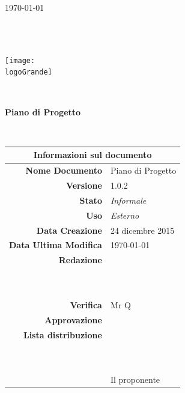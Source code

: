 \documentclass[12pt,a4paper]{article}
\title{\titoloDocumento}
\newcommand{\titoloDocumento}{Piano di Progetto}
\newcommand{\dataCreazione}{24 dicembre 2015}
\newcommand{\versione}{1.0.2}
\newcommand{\stato}{Informale}
\newcommand{\uso}{Esterno}
\begin{document}
\begin{titlepage}
\begin{center}
\today \\
\vspace{1cm}
\begin{Huge}
\textbf{\nomeGruppo} \\
\end{Huge}
\textbf{\prjL} \\
\vspace{1cm}
\texttt{[image: \\logoGrande]}
\vspace{1cm}

\HRule \\[0.4cm]
\begin{Huge}
{\huge \bfseries \titoloDocumento}\\[0.4cm]
\end{Huge}
\HRule \\[1cm]
\vfill

\begin{table}[h]
\begin{center}
\begin{tabular}{r | l}
\multicolumn{2}{c}{\textbf{Informazioni sul documento}}\\
\midrule
\textbf{Nome Documento}	&	\titoloDocumento	\\
\textbf{Versione}	&	\versione	\\
\textbf{Stato}	&	\emph{\stato}	\\
\textbf{Uso}	&	\emph{\uso}	\\
\textbf{Data Creazione}	&	\dataCreazione	\\
\textbf{Data Ultima Modifica}	&	\today	\\
\textbf{Redazione}	& \NDC \\
\ 	& \TP \\
\ 	& \IB \\
\textbf{Verifica}	&	Mr Q	\\
\textbf{Approvazione}	& \NDC \\
\textbf{Lista distribuzione}	&	\nomeGruppo	\\
\ 	&	\Vardanega	\\
\ 	&	\Cardin	\\
\ 	&	Il proponente \Zucchetti	\\

\end{tabular}
\end{center}
\end{table}

\end{center}
\end{titlepage}
\newpage
\end{document}
